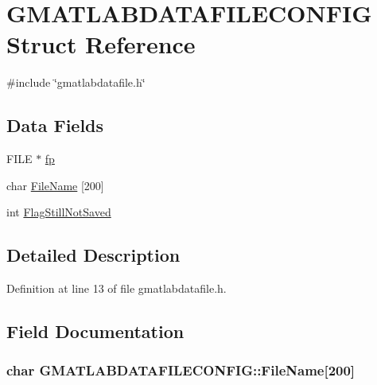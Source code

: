 \hypertarget{structGMATLABDATAFILECONFIG}{\section{G\-M\-A\-T\-L\-A\-B\-D\-A\-T\-A\-F\-I\-L\-E\-C\-O\-N\-F\-I\-G Struct Reference}
\label{structGMATLABDATAFILECONFIG}
}


{\ttfamily \#include \char`\"{}gmatlabdatafile.\-h\char`\"{}}

\subsection*{Data Fields}
\begin{DoxyCompactItemize}
\item 
F\-I\-L\-E $\ast$ \hyperlink{structGMATLABDATAFILECONFIG_a900bde88d01e7b5380101446c89a06a6}{fp}
\item 
char \hyperlink{structGMATLABDATAFILECONFIG_ada4eb3a8fbcfdcb41723f31d09e0bd19}{File\-Name} \mbox{[}200\mbox{]}
\item 
int \hyperlink{structGMATLABDATAFILECONFIG_a58d1c2a70b22c7c08eccaaea77990db2}{Flag\-Still\-Not\-Saved}
\end{DoxyCompactItemize}


\subsection{Detailed Description}


Definition at line 13 of file gmatlabdatafile.\-h.



\subsection{Field Documentation}
\hypertarget{structGMATLABDATAFILECONFIG_ada4eb3a8fbcfdcb41723f31d09e0bd19}{
\subsubsection[{File\-Name}]{\setlength{\rightskip}{0pt plus 5cm}char G\-M\-A\-T\-L\-A\-B\-D\-A\-T\-A\-F\-I\-L\-E\-C\-O\-N\-F\-I\-G\-::\-File\-Name\mbox{[}200\mbox{]}}}\label{structGMATLABDATAFILECONFIG_ada4eb3a8fbcfdcb41723f31d09e0bd19}


